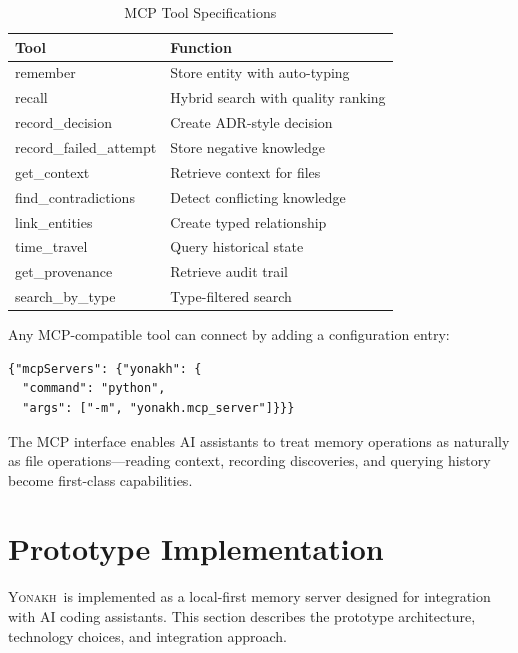 \documentclass[10pt,journal,compsoc]{IEEEtran}
\newcommand{\yonakh}{\textsc{Yonakh}}
\begin{document}
\begin{table}[t]
\caption{MCP Tool Specifications}
\label{tab:mcp}
\centering
\small
\renewcommand{\arraystretch}{1.3}
\begin{tabular}{@{}p{} p{}@{}}
\toprule
\textbf{Tool} & \textbf{Function} \\
\midrule
remember & Store entity with auto-typing \\
recall & Hybrid search with quality ranking \\
record\_decision & Create ADR-style decision \\
record\_failed\_attempt & Store negative knowledge \\
get\_context & Retrieve context for files \\
find\_contradictions & Detect conflicting knowledge \\
link\_entities & Create typed relationship \\
time\_travel & Query historical state \\
get\_provenance & Retrieve audit trail \\
search\_by\_type & Type-filtered search \\
\bottomrule
\end{tabular}
\end{table}

Any MCP-compatible tool can connect by adding a configuration entry:

\begin{verbatim}
{"mcpServers": {"yonakh": {
  "command": "python",
  "args": ["-m", "yonakh.mcp_server"]}}}
\end{verbatim}

The MCP interface enables AI assistants to treat memory operations as naturally as file operations---reading context, recording discoveries, and querying history become first-class capabilities.

\section{Prototype Implementation}

\yonakh\ is implemented as a local-first memory server designed for integration with AI coding assistants. This section describes the prototype architecture, technology choices, and integration approach.
\end{document}
